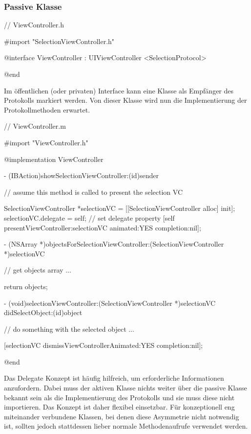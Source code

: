 \documentclass[parskip=half, final]{scrreprt}
\begin{document}
\subsubsection{Passive Klasse}
\begin{objclst}
// ViewController.h

#import "SelectionViewController.h"

@interface ViewController : UIViewController <SelectionProtocol>

@end
\end{objclst}

Im öffentlichen (oder privaten) Interface kann eine Klasse als Empfänger des Protokolls markiert werden. Von dieser Klasse wird nun die Implementierung der Protokollmethoden erwartet.

\begin{objclst}
// ViewController.m

#import "ViewController.h"

@implementation ViewController

- (IBAction)showSelectionViewController:(id)sender {
    // assume this method is called to present the selection VC
    
    SelectionViewController *selectionVC = [[SelectionViewController alloc] init];
    selectionVC.delegate = self; // set delegate property
    [self presentViewController:selectionVC animated:YES completion:nil];
    
}

- (NSArray *)objectsForSelectionViewController:(SelectionViewController *)selectionVC {

    // get objects array ...

    return objects;
}

- (void)selectionViewController:(SelectionViewController *)selectionVC didSelectObject:(id)object {
    
    // do something with the selected object ...
    
    [selectionVC dismissViewControllerAnimated:YES completion:nil];
}

@end
\end{objclst}

Das Delegate Konzept ist häufig hilfreich, um erforderliche Informationen anzufordern. Dabei muss der aktiven Klasse nichts weiter über die passive Klasse bekannt sein als die Implementierung des Protokolls und sie muss diese nicht importieren. Das Konzept ist daher flexibel einsetzbar. Für konzeptionell eng miteinander verbundene Klassen, bei denen diese Asymmetrie nicht notwendig ist, sollten jedoch stattdessen lieber normale Methodenaufrufe verwendet werden.
\end{document}
